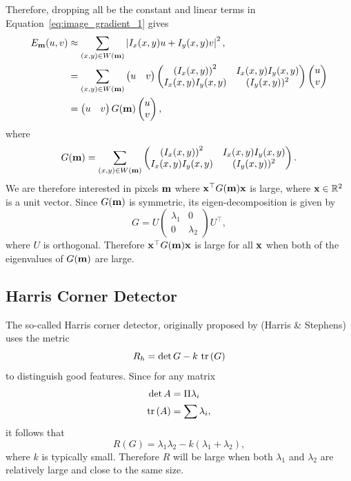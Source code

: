 Therefore, dropping all be the constant and linear terms in Equation~\eqref{eq:image_gradient_1} gives
\begin{align*}
E_{\mathbf{m}}(u,v) &\approx \sum_{(x,y)\in W(\mathbf{m})} \left|I_x(x,y)u +I_y(x,y) v \right|^2,\\
&= \sum_{(x,y)\in W(\mathbf{m})} \begin{pmatrix} u & v \end{pmatrix}\begin{pmatrix}\left(I_x(x,y)\right)^2 & I_x(x,y) I_y(x,y) \\
I_x(x,y)I_y(x,y) & (I_y(x,y))^2 \end{pmatrix}\begin{pmatrix}u \\ v\end{pmatrix} \\
&= \begin{pmatrix} u & v \end{pmatrix} G(\mathbf{m}) \begin{pmatrix}u \\ v\end{pmatrix},
\end{align*}
where
\begin{equation}\label{eq:G_mbf}
G(\mbf) = \sum_{(x,y)\in W(\mbf)} \begin{pmatrix}\left(I_x(x,y)\right)^2 & I_x(x,y) I_y(x,y) \\
I_x(x,y)I_y(x,y) & (I_y(x,y))^2 \end{pmatrix}.
\end{equation}
We are therefore interested in pixels $\mathbf{m}$ where $\mathbf{x}^\top G(\mathbf{m}) \mathbf{x}$ is large, where $\mathbf{x}\in\mathbb{R}^2$ is a unit vector.  Since $G(\mathbf{m})$ is symmetric, its eigen-decomposition is given by
\[
G = U\begin{pmatrix} \lambda_1 & 0 \\ 0 & \lambda_2 \end{pmatrix} U^\top,
\] 
where $U$ is orthogonal.  Therefore $\mathbf{x}^\top G(\mathbf{m}) \mathbf{x}$ is large for all $\mathbf{x}$ when both of the eigenvalues of $G(\mathbf{m})$ are large.  

\subsection{Harris Corner Detector}
The so-called Harris corner detector, originally proposed by (Harris \& Stephens)\cite{HarrisStephen88} uses the metric
\[
R_h = \det{G} - k~\text{tr}\left(G\right)
\]
to distinguish good features.  
Since for any matrix
\begin{align*}
\det{A} &= \Pi \lambda_i \\
\text{tr}\left(A\right) &= \sum \lambda_i,
\end{align*}
it follows that 
\[
R(G) = \lambda_1\lambda_2 - k(\lambda_1+\lambda_2),
\]
where $k$ is typically small.  Therefore $R$ will be large when both $\lambda_1$ and $\lambda_2$ are relatively large and close to the same size.

